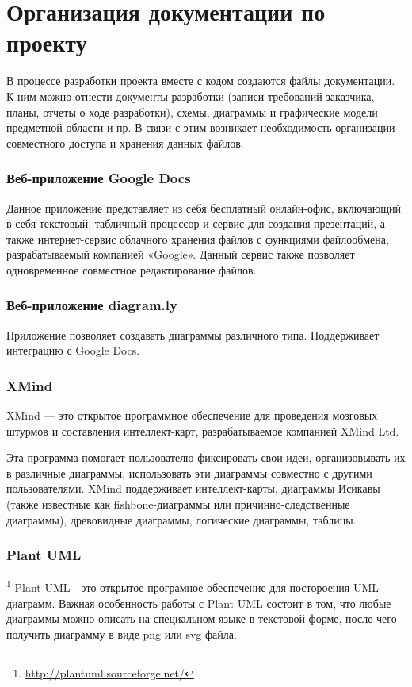 \section{Организация документации по проекту}
В процессе разработки проекта вместе с кодом создаются файлы документации. К ним
можно отнести документы разработки (записи требований заказчика, планы, отчеты о
ходе разработки), схемы, диаграммы и графические модели предметной области и пр.
В связи с этим возникает необходимость организации совместного доступа и
хранения данных файлов.

\subsubsection{Веб-приложение  Google Docs}
Данное приложение представляет из себя бесплатный онлайн-офис, включающий в себя
текстовый, табличный процессор и сервис для создания презентаций, а также
интернет-сервис облачного хранения файлов с функциями файлообмена,
разрабатываемый компанией «Google». Данный сервис также позволяет одновременное
совместное редактирование файлов.

\subsubsection{Веб-приложение diagram.ly}
Приложение позволяет создавать диаграммы различного типа. Поддерживает интеграцию с Google Docs.

\subsubsection{XMind}
XMind — это открытое программное обеспечение для проведения мозговых штурмов и
составления интеллект-карт, разрабатываемое компанией XMind Ltd.

Эта программа помогает пользователю фиксировать свои идеи, организовывать их в
различные диаграммы, использовать эти диаграммы совместно с другими
пользователями. XMind поддерживает интеллект-карты, диаграммы Исикавы (также
известные как fishbone-диаграммы или причинно-следственные диаграммы),
древовидные диаграммы, логические диаграммы, таблицы.

\subsubsection{Plant UML}\footnote{
	\url{http://plantuml.sourceforge.net/}
}
Plant UML - это открытое програмное обеспечение для постороения UML-диаграмм.
Важная особенность работы с Plant UML состоит в том, что любые диаграммы можно
описать на специальном языке в текстовой форме, после чего получить диаграмму в
виде png или svg файла.
